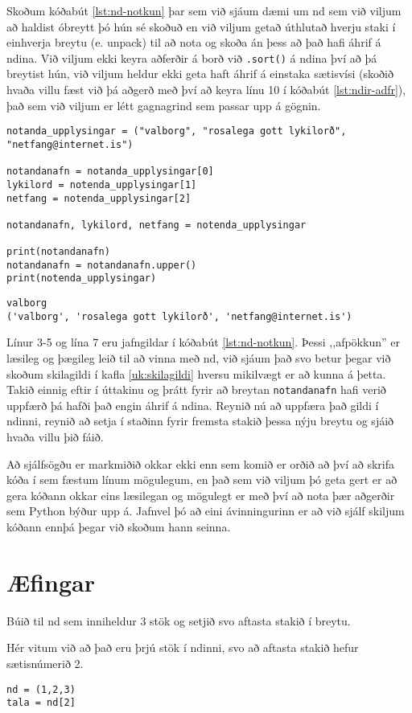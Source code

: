 Skoðum kóðabút \ref{lst:nd-notkun} þar sem við sjáum dæmi um nd sem við viljum að haldist óbreytt þó hún sé skoðuð en við viljum getað úthlutað hverju staki í einhverja breytu (e. unpack) til að nota og skoða án þess að það hafi áhrif á ndina.
Við viljum ekki keyra aðferðir á borð við \texttt{.sort()} á ndina því að þá breytist hún, við viljum heldur ekki geta haft áhrif á einstaka sætisvísi (skoðið hvaða villu fæst við þá aðgerð með því að keyra línu 10 í kóðabút \ref{lst:ndir-adfr}), það sem við viljum er létt gagnagrind sem passar upp á gögnin.


\begin{lstlisting}[caption=Ndir notaðar fyrir það sem þær eru gagnlegar, label=lst:nd-notkun]
notanda_upplysingar = ("valborg", "rosalega gott lykilorð", "netfang@internet.is")

notandanafn = notanda_upplysingar[0]
lykilord = notenda_upplysingar[1]
netfang = notenda_upplysingar[2]

notandanafn, lykilord, netfang = notenda_upplysingar

print(notandanafn)
notandanafn = notandanafn.upper()
print(notenda_upplysingar)
\end{lstlisting}
\lstset{style=uttak}
\begin{lstlisting}
valborg
('valborg', 'rosalega gott lykilorð', 'netfang@internet.is')
\end{lstlisting}
\lstset{style=venjulegt}

Línur 3-5 og lína 7 eru jafngildar í kóðabút \ref{lst:nd-notkun}.
Þessi ,,afpökkun'' er læsileg og þægileg leið til að vinna með nd, við sjáum það svo betur þegar við skoðum skilagildi í kafla \ref{uk:skilagildi} hversu mikilvægt er að kunna á þetta.
Takið einnig eftir í úttakinu og þrátt fyrir að breytan \texttt{notandanafn} hafi verið uppfærð þá hafði það engin áhrif á ndina.
Reynið nú að uppfæra það gildi í ndinni, reynið að setja í staðinn fyrir fremsta stakið þessa nýju breytu og sjáið hvaða villu þið fáið.

Að sjálfsögðu er markmiðið okkar ekki enn sem komið er orðið að því að skrifa kóða í sem fæstum línum mögulegum, en það sem við viljum þó geta gert er að gera kóðann okkar eins læsilegan og mögulegt er með því að nota þær aðgerðir sem Python býður upp á.
Jafnvel þó að eini ávinningurinn er að við sjálf skiljum kóðann ennþá þegar við skoðum hann seinna.

\newpage
\section{Æfingar}
\begin{exercise}\label{nd1}
Búið til nd sem inniheldur 3 stök og setjið svo aftasta stakið í breytu.
\end{exercise}
\begin{Answer}[ref={nd1}]
Hér vitum við að það eru þrjú stök í ndinni, svo að aftasta stakið hefur sætisnúmerið 2.
\begin{lstlisting}
nd = (1,2,3)
tala = nd[2]\end{lstlisting}
\end{Answer}

